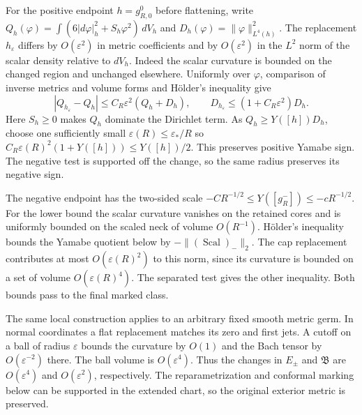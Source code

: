 \documentclass[11pt]{article}
\numberwithin{equation}{section}
\theoremstyle{definition}
\theoremstyle{remark}
\DeclareMathOperator{\Scal}{Scal}
\begin{document}
For the positive endpoint \(h=g^0_{R,0}\) before flattening,
write \(Q_h(\varphi)=\int(6|d\varphi|_h^2+S_h\varphi^2)\,dV_h\)
and \(D_h(\varphi)=\|\varphi\|_{L^4(h)}^2\).
The replacement \(h_\varepsilon\) differs by \(O(\varepsilon^2)\)
in metric coefficients and by \(O(\varepsilon^2)\) in the
\(L^2\) norm of the scalar density relative to \(dV_h\).
Indeed the scalar curvature is bounded on the changed region
and unchanged elsewhere. Uniformly over \(\varphi\), comparison
of inverse metrics and volume forms and Hölder's inequality give
\[
 |Q_{h_\varepsilon}-Q_h|\le C_R\varepsilon^2(Q_h+D_h),\qquad
 D_{h_\varepsilon}\le(1+C_R\varepsilon^2)D_h .
\]
Here \(S_h\ge0\) makes \(Q_h\) dominate the Dirichlet term.
As \(Q_h\ge Y([h])D_h\), choose one sufficiently small
\(\varepsilon(R)\le \varepsilon_*/R\) so
\(C_R\varepsilon(R)^2(1+Y([h]))\le Y([h])/2\). This preserves
positive Yamabe sign. The negative test is supported off the
change, so the same radius preserves its negative sign.

The negative endpoint has the two-sided scale
\(-C R^{-1/2}\le Y([g_R^-])\le-cR^{-1/2}\). For the
lower bound the scalar curvature vanishes on the retained cores
and is uniformly bounded on the scaled neck of volume \(O(R^{-1})\).
H\"older's inequality bounds the Yamabe quotient below by
\(-\|(\Scal)_-\|_2\). The cap replacement contributes at most
\(O(\varepsilon(R)^2)\) to this norm, since its curvature is bounded
on a set of volume \(O(\varepsilon(R)^4)\). The separated test gives
the other inequality. Both bounds pass to the final marked class.

The same local construction applies to an arbitrary fixed smooth metric
germ. In normal coordinates a flat replacement matches its zero and first
jets. A cutoff on a ball of radius \(\varepsilon\) bounds the curvature
by \(O(1)\) and the Bach tensor by \(O(\varepsilon^{-2})\) there. The ball
volume is \(O(\varepsilon^4)\). Thus the changes in \(E_\pm\) and
\(\mathfrak B\) are \(O(\varepsilon^4)\) and \(O(\varepsilon^2)\),
respectively. The reparametrization and conformal marking below can be
supported in the extended chart, so the original exterior metric is preserved.
\end{document}
